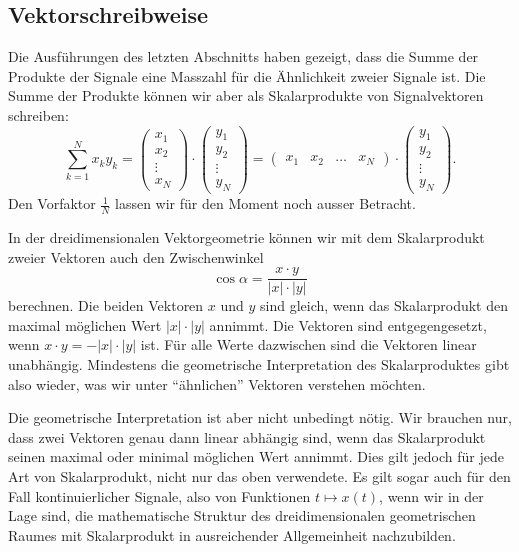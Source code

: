 \subsection{Vektorschreibweise}
Die Ausführungen des letzten Abschnitts haben gezeigt, dass die Summe der
Produkte der Signale eine Masszahl für die Ähnlichkeit zweier Signale ist.
Die Summe der Produkte können wir aber als Skalarprodukte von Signalvektoren
%
schreiben:
\[
\sum_{k=1}^N x_ky_k
=
\begin{pmatrix}x_1\\x_2\\\vdots\\x_N\end{pmatrix}
\cdot
\begin{pmatrix}y_1\\y_2\\\vdots\\y_N\end{pmatrix}
=
\begin{pmatrix}x_1&x_2&\dots&x_N\end{pmatrix}
\cdot
\begin{pmatrix}y_1\\y_2\\\vdots\\y_N\end{pmatrix}.
\]
Den Vorfaktor $\frac1{N}$ lassen wir für den Moment noch ausser Betracht.

In der dreidimensionalen Vektorgeometrie können wir mit dem Skalarprodukt
zweier Vektoren auch den Zwischenwinkel
\[
\cos\alpha
=
\frac{
x\cdot y
}{
|x|\cdot |y|
}
\]
berechnen.
Die beiden Vektoren $x$ und $y$ sind gleich, wenn das Skalarprodukt
den maximal möglichen Wert $|x|\cdot |y|$ annimmt.
Die Vektoren sind entgegengesetzt, wenn $x\cdot y=-|x|\cdot |y|$ ist.
Für alle Werte dazwischen sind die Vektoren linear unabhängig.
Mindestens die geometrische Interpretation des Skalarproduktes gibt also
wieder, was wir unter ``ähnlichen'' Vektoren verstehen möchten.

Die geometrische Interpretation ist aber nicht unbedingt nötig.
Wir brauchen nur, dass zwei Vektoren genau dann linear abhängig sind,
wenn das Skalarprodukt seinen maximal oder minimal möglichen Wert annimmt.
Dies gilt jedoch für jede Art von Skalarprodukt, nicht nur das oben
verwendete.
Es gilt sogar auch für den Fall kontinuierlicher Signale, also von
Funktionen $t\mapsto x(t)$, wenn wir in der Lage sind, die mathematische
Struktur des dreidimensionalen geometrischen Raumes mit Skalarprodukt
in ausreichender Allgemeinheit nachzubilden.

